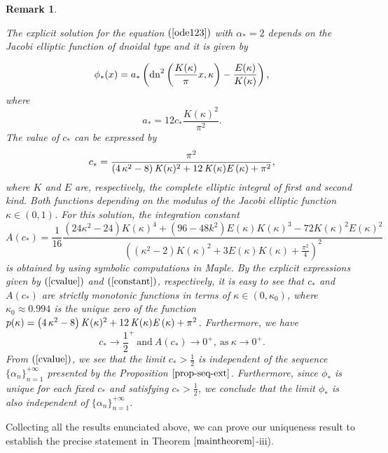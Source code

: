 \documentclass[12pt,reqno]{amsart}
\newcommand{\2}{L^2_{per}(0, T)}
\numberwithin{equation}{section}
\numberwithin{figure}{section}
\newtheorem{remark}[theorem]{Remark}
\begin{document}
\begin{remark}\label{rem-uniq1}
	
	The explicit solution for the equation $(\ref{ode123})$ with $\alpha_{*}=2$ depends on the Jacobi elliptic function of \textit{dnoidal} type and it is given by
	
	\begin{equation}\label{dnsol}
	\phi_*(x)=a_*\left({\rm dn}^2\left(\frac{K(\kappa)}{\pi}x,\kappa\right)-\frac{E( \kappa)}{K( \kappa)}\right),
	\end{equation}
	where
	$$a_*= 12c_{*}\frac{K(\kappa)^2}{\pi^2}.$$
	The value of $c_{*}$ can be expressed by
	\begin{equation}\label{cvalue}	c_{*}={\frac {{\pi }^{2}}{ \left( 4\,{\kappa}^{2}-8 \right)   {\it
				K}(\kappa)^{2}+12\,{\it K} ( \kappa)
			{\it E} \left( \kappa \right) +{\pi }^{2}}},\end{equation}
	where $K$ and $E$ are, respectively, the complete elliptic integral of first and second kind. Both functions depending on the modulus of the Jacobi elliptic function $\kappa\in(0,1)$.
 For this solution, the  integration constant
 \begin{equation}\label{constant}
 	A(c_*)=\frac{1}{16}\frac{(24\kappa^2-24)K(\kappa)^4+(96-48k^2)E(\kappa)K(\kappa)^3-72K(\kappa)^2E(\kappa)^2}{\left((\kappa^2-2)K(\kappa)^2+3E(\kappa)K(\kappa)+\frac{\pi^2}{4}\right)^2}
 	 \end{equation}
 is obtained by using symbolic computations in Maple. By the explicit expressions given by $(\ref{cvalue})$ and $(\ref{constant})$, respectively, it is easy to see that $c_{*}$ and $A(c_*)$ are strictly monotonic functions in terms of $\kappa\in(0,\kappa_0)$, where $\kappa_0\approx0.994$ is the unique zero of the function $p(\kappa)=\left( 4\,{\kappa}^{2}-8 \right)   {\it K}(\kappa)^{2}+12\,{\it K} ( \kappa){\it E} \left( \kappa \right) +{\pi }^{2}$. Furthermore, we have $$c_*\rightarrow \frac{1}{2}^{+}\  \mbox{and}\ A(c_*)\rightarrow 0^{+},\ \mbox{as}\ \kappa\rightarrow 0^{+}.$$
	\indent From $(\ref{cvalue})$, we see that the limit $c_{*}>\frac{1}{2}$ is independent of the sequence $\{\alpha_n\}_{n=1}^{+\infty}$ presented by the Proposition $\ref{prop-seq-ext}$. Furthermore, since $\phi_{*}$ is unique for each fixed $c_{*}$ and satisfying $c_{*}>\frac{1}{2}$, we conclude that the limit $\phi_{*}$ is also independent of $\{\alpha_n\}_{n=1}^{+\infty}$.
\end{remark}


\indent Collecting all the results enunciated above, we can prove our uniqueness result to establish the precise statement in Theorem $\ref{maintheorem}$-iii).
\end{document}
